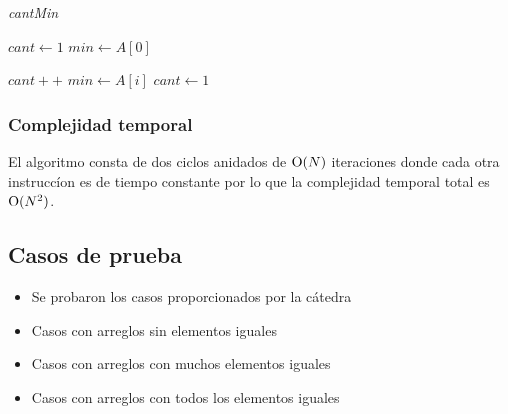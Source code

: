 \bigskip

\begin{algorithm}[H]
	\caption{\textit{cantMin}}

	$cant \gets 1$ \;
	$min \gets A[0]$ \;

     {
    	 {
    		$cant++$ \;
    	}
    	 {
			$min \gets A[i]$ \;
    		$cant \gets 1$ \;
    	}
	}

\end{algorithm}

\bigskip

\subsubsection{Complejidad temporal}

El algoritmo consta de dos ciclos anidados de $\operatorname{O}(N)$ iteraciones donde cada
otra instruccíon es de tiempo constante por lo que la complejidad temporal
total es $\operatorname{O}(N^2)$.

\subsection{Casos de prueba}

\begin{itemize}
\item Se probaron los casos proporcionados por la cátedra
\item Casos con arreglos sin elementos iguales
\item Casos con arreglos con muchos elementos iguales
\item Casos con arreglos con todos los elementos iguales
\end{itemize}

